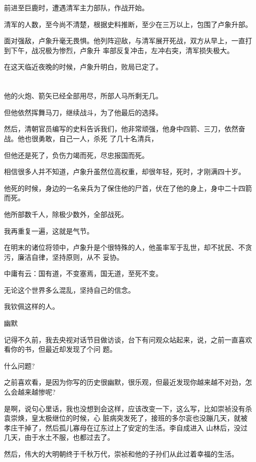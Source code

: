 \documentclass[11pt,a4paper,onecolumn]{article}
\begin{document}
前进至巨鹿时，遭遇清军主力部队，作战开始。

清军的人数，至今尚不清楚，根据史料推断，至少在三万以上，包围了卢象升部。

面对强敌，卢象升毫无畏惧。他列阵迎敌，与清军展开死战，双方从早上，一直打到下午，战况极为惨烈，卢象升
率部反复冲击，左冲右突，清军损失极大。

在这天临近夜晚的时候，卢象升明白，败局已定了。

\section[\thesection]{}

他的火炮、箭矢已经全部用尽，所部人马所剩无几。

但他依然挥舞马刀，继续战斗，为了他最后的选择。

然后，清朝官员编写的史料告诉我们，他非常顽强，他身中四箭、三刀，依然奋战。他也很勇敢，自己一人，杀死
了几十名清兵，

但他还是死了，负伤力竭而死，尽忠报国而死。

相信很多人并不知道，卢象升虽然位高权重，却很年轻，死时，才刚满四十岁。

他死的时候，身边的一名亲兵为了保住他的尸首，伏在了他的身上，身中二十四箭而死。

他所部数千人，除极少数外，全部战死。

我再重复一遍，这就是气节。

在明末的诸位将领中，卢象升是个很特殊的人，他虽率军于乱世，却不扰民、不贪污，廉洁自律，坚持原则，从不
妥协。

中庸有云：国有道，不变塞焉，国无道，至死不变。

无论这个世界多么混乱，坚持自己的信念。

我钦佩这样的人。

幽默

记得不久前，我去央视对话节目做访谈，台下有问观众站起来，说，之前一直喜欢看你的书，但最近却发现了个问
题。

什么问题?

之前喜欢看，是因为你写的历史很幽默，很乐观，但最近发现你越来越不对劲，怎么会越来越惨呢?

是啊，说句心里话，我也没想到会这样，应该改变一下，这么写，比如崇祯没有杀袁崇焕，皇太极继位的时候，心
脏病突发死了，接班的多尔衮也没蹦几天，就被孝庄干掉了，然后孤儿寡母在辽东过上了安定的生活。李自成进入
山林后，没过几天，由于水土不服，也都过去了。

然后，伟大的大明朝终于千秋万代，崇祯和他的子孙们从此过着幸福的生活。
\end{document}
